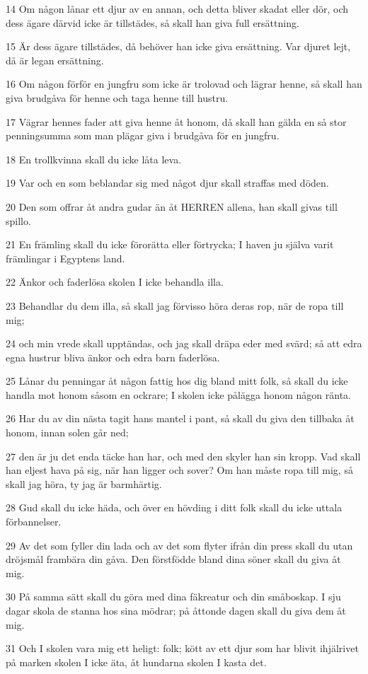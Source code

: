 \par 14 Om någon lånar ett djur av en annan, och detta bliver skadat eller dör, och dess ägare därvid icke är tillstädes, så skall han giva full ersättning.
\par 15 Är dess ägare tillstädes, då behöver han icke giva ersättning. Var djuret lejt, då är legan ersättning.
\par 16 Om någon förför en jungfru som icke är trolovad och lägrar henne, så skall han giva brudgåva för henne och taga henne till hustru.
\par 17 Vägrar hennes fader att giva henne åt honom, då skall han gälda en så stor penningsumma som man plägar giva i brudgåva för en jungfru.
\par 18 En trollkvinna skall du icke låta leva.
\par 19 Var och en som beblandar sig med något djur skall straffas med döden.
\par 20 Den som offrar åt andra gudar än åt HERREN allena, han skall givas till spillo.
\par 21 En främling skall du icke förorätta eller förtrycka; I haven ju själva varit främlingar i Egyptens land.
\par 22 Änkor och faderlösa skolen I icke behandla illa.
\par 23 Behandlar du dem illa, så skall jag förvisso höra deras rop, när de ropa till mig;
\par 24 och min vrede skall upptändas, och jag skall dräpa eder med svärd; så att edra egna hustrur bliva änkor och edra barn faderlösa.
\par 25 Lånar du penningar åt någon fattig hos dig bland mitt folk, så skall du icke handla mot honom såsom en ockrare; I skolen icke pålägga honom någon ränta.
\par 26 Har du av din nästa tagit hans mantel i pant, så skall du giva den tillbaka åt honom, innan solen går ned;
\par 27 den är ju det enda täcke han har, och med den skyler han sin kropp. Vad skall han eljest hava på sig, när han ligger och sover? Om han måste ropa till mig, så skall jag höra, ty jag är barmhärtig.
\par 28 Gud skall du icke häda, och över en hövding i ditt folk skall du icke uttala förbannelser.
\par 29 Av det som fyller din lada och av det som flyter ifrån din press skall du utan dröjsmål frambära din gåva. Den förstfödde bland dina söner skall du giva åt mig.
\par 30 På samma sätt skall du göra med dina fäkreatur och din småboskap. I sju dagar skola de stanna hos sina mödrar; på åttonde dagen skall du giva dem åt mig.
\par 31 Och I skolen vara mig ett heligt: folk; kött av ett djur som har blivit ihjälrivet på marken skolen I icke äta, åt hundarna skolen I kasta det.

